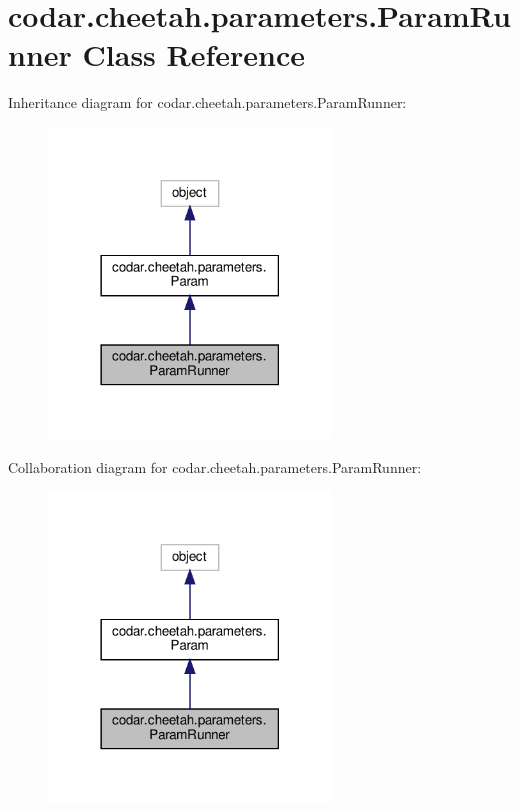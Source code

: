 \hypertarget{classcodar_1_1cheetah_1_1parameters_1_1_param_runner}{}\section{codar.\+cheetah.\+parameters.\+Param\+Runner Class Reference}
\label{classcodar_1_1cheetah_1_1parameters_1_1_param_runner}


Inheritance diagram for codar.\+cheetah.\+parameters.\+Param\+Runner\+:
\nopagebreak
\begin{figure}[H]
\begin{center}
\leavevmode
\includegraphics[width=213pt]{classcodar_1_1cheetah_1_1parameters_1_1_param_runner__inherit__graph}
\end{center}
\end{figure}


Collaboration diagram for codar.\+cheetah.\+parameters.\+Param\+Runner\+:
\nopagebreak
\begin{figure}[H]
\begin{center}
\leavevmode
\includegraphics[width=213pt]{classcodar_1_1cheetah_1_1parameters_1_1_param_runner__coll__graph}
\end{center}
\end{figure}
